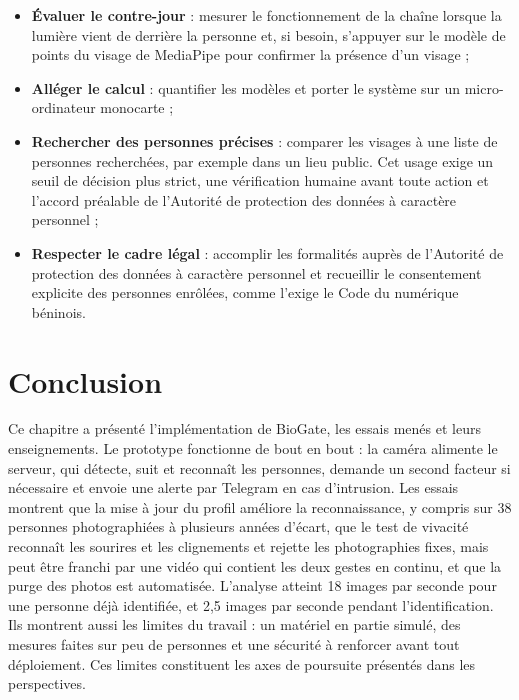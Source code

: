 \begin{maj}
\begin{itemize}
  \item \textbf{Évaluer le contre-jour} : mesurer le fonctionnement de la chaîne lorsque la lumière vient de derrière la personne et, si besoin, s'appuyer sur le modèle de points du visage de MediaPipe pour confirmer la présence d'un visage\nouvmark{} ;
  \item \textbf{Alléger le calcul} : quantifier les modèles et porter le système sur un micro-ordinateur monocarte ;
  \item \textbf{Rechercher des personnes précises} : comparer les visages à une liste de personnes recherchées, par exemple dans un lieu public. Cet usage exige un seuil de décision plus strict, une vérification humaine avant toute action et l'accord préalable de l'Autorité de protection des données à caractère personnel ;
  \item \textbf{Respecter le cadre légal} : accomplir les formalités auprès de l'Autorité de protection des données à caractère personnel et recueillir le consentement explicite des personnes enrôlées, comme l'exige le Code du numérique béninois.
\end{itemize}
\end{maj}

\section*{Conclusion}

\begin{maj}
Ce chapitre a présenté l'implémentation de BioGate, les essais menés et leurs enseignements. Le prototype fonctionne de bout en bout : la caméra alimente le serveur, qui détecte, suit et reconnaît les personnes, demande un second facteur si nécessaire et envoie une alerte par Telegram en cas d'intrusion. Les essais montrent que la mise à jour du profil améliore la reconnaissance, y compris sur 38 personnes photographiées à plusieurs années d'écart, que le test de vivacité reconnaît les sourires et les clignements et rejette les photographies fixes, mais peut être franchi par une vidéo qui contient les deux gestes en continu, et que la purge des photos est automatisée. L'analyse atteint 18 images par seconde pour une personne déjà identifiée, et 2,5 images par seconde pendant l'identification. Ils montrent aussi les limites du travail : un matériel en partie simulé, des mesures faites sur peu de personnes et une sécurité à renforcer avant tout déploiement. Ces limites constituent les axes de poursuite présentés dans les perspectives.
\end{maj}
